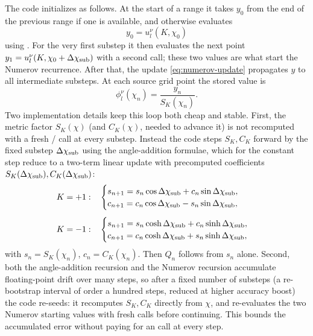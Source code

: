 \documentclass[11pt,a4paper]{article}
\newcommand{\code}[1]{\texttt{\detokenize{#1}}}
\newcommand{\SK}{S_K}
\newcommand{\CK}{C_K}
\begin{document}
The code initializes as follows.  At the start of a range it takes \(y_0\) from the end of the previous range if one is available, and otherwise evaluates
\begin{equation}
  y_0=u_l^\nu(K,\chi_0)
\end{equation}
using \code{u_olver}.  For the very first substep it then evaluates the next point \(y_1=u_l^\nu(K,\chi_0+\Delta\chi_{\rm sub})\) with a second \code{u_olver} call; these two values are what start the Numerov recurrence.  After that, the update \eqref{eq:numerov-update} propagates \(y\) to all intermediate substeps.  At each source grid point the stored value is
\begin{equation}
  \phi_l^\nu(\chi_n)=\frac{y_n}{\SK(\chi_n)}.
\end{equation}
Two implementation details keep this loop both cheap and stable.  First, the
metric factor \(\SK(\chi)\) (and \(\CK(\chi)\), needed to advance it) is not
recomputed with a fresh \code{sin}/\code{sinh} call at every substep.  Instead
the code steps \(\SK,\CK\) forward by the fixed substep \(\Delta\chi_{\rm sub}\)
using the angle-addition formulae, which for the constant step reduce to a
two-term linear update with precomputed coefficients
\(\SK(\Delta\chi_{\rm sub}),\CK(\Delta\chi_{\rm sub})\):
\begin{equation}
  \begin{aligned}
  K=+1:&\quad
  \begin{cases}
    s_{n+1}=s_n\cos\Delta\chi_{\rm sub}+c_n\sin\Delta\chi_{\rm sub},\\
    c_{n+1}=c_n\cos\Delta\chi_{\rm sub}-s_n\sin\Delta\chi_{\rm sub},
  \end{cases}\\[1ex]
  K=-1:&\quad
  \begin{cases}
    s_{n+1}=s_n\cosh\Delta\chi_{\rm sub}+c_n\sinh\Delta\chi_{\rm sub},\\
    c_{n+1}=c_n\cosh\Delta\chi_{\rm sub}+s_n\sinh\Delta\chi_{\rm sub},
  \end{cases}
  \end{aligned}
\end{equation}
with \(s_n=\SK(\chi_n)\), \(c_n=\CK(\chi_n)\).  Then \(Q_n\) follows from
\(s_n\) alone.  Second, both the angle-addition recursion and the Numerov
recursion accumulate floating-point drift over many steps, so after a fixed
number of substeps (a re-bootstrap interval of order a hundred steps, reduced
at higher accuracy boost) the code re-seeds: it recomputes \(\SK,\CK\) directly
from \(\chi\), and re-evaluates the two Numerov starting values with fresh
\code{u_olver} calls before continuing.  This bounds the accumulated error
without paying for an \code{u_olver} call at every step.
\end{document}
